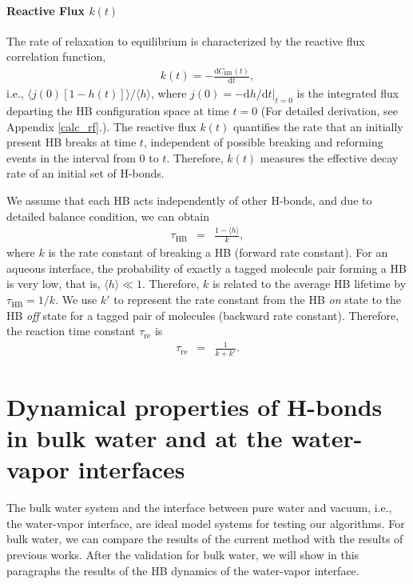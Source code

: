 \FloatBarrier
\paragraph{Reactive Flux $k(t)$} 
The rate of relaxation to equilibrium is characterized by the reactive flux correlation function, 
\begin{eqnarray}
k(t) = -\frac{\text{d}C_{\text{HB}}(t)}{\text{d}t},
\label{eq:k}
\end{eqnarray}
i.e., $\langle j(0)[1-h(t)]\rangle/\langle h\rangle$,
where 
$j(0)=-\text{d}h/\text{d}t|_{t=0}$ 
is the integrated flux departing the HB configuration space at time $t=0$ (For detailed derivation, see Appendix \ref{calc_rf}.).
The reactive flux $k(t)$ quantifies the rate that an initially present HB breaks at time $t$, 
independent of possible breaking and reforming events in the interval from 0 to $t$.
Therefore, $k(t)$ measures the effective decay rate of an 
initial set of H-bonds. \cite{DC87,FWS00}


We assume that each HB acts independently of other H-bonds, \cite{AL96,AL00} 
and due to detailed balance condition, we can obtain 
\begin{eqnarray}
  \tau_{\text{HB}} &=& \frac{1- \langle h\rangle}{k},
\label{eq:rate}
\end{eqnarray}
where $k$ is the rate constant of breaking a HB (forward rate constant). \cite{Chandler1986,Chandler1978} 
For an aqueous interface, the probability of exactly a tagged molecule pair forming a HB is very low, that is, $\langle h\rangle \ll 1$. 
Therefore, $k$ is related to the average HB lifetime by $\tau_{\text{HB}}=1/k$.
We use $k'$ to represent the rate constant from the HB \emph{on} state to the HB \emph{off} state for a tagged pair of molecules (backward rate constant).
Therefore, the reaction time constant $\tau_\text{re}$ is 
\begin{eqnarray}
  \tau_\text{re} &=& \frac{1}{k+k'}.
\label{eq:reaction_rate_tau}
\end{eqnarray}

%
\FloatBarrier
\section{Dynamical properties of H-bonds in bulk water and at the water-vapor interfaces}
The bulk water system and the interface between pure water and vacuum, i.e., the water-vapor interface, 
are ideal model systems for testing our algorithms.
For bulk water, we can compare the results of the current method with the results of 
previous works.\cite{AL96,Kessler2015} After the validation for bulk water, we will show in this paragraphs the results of the HB dynamics of the water-vapor interface.

